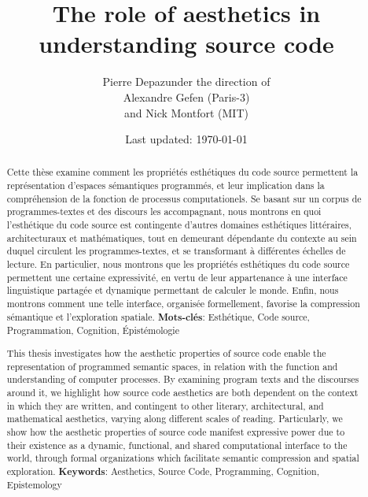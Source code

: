 \documentclass{report}
\begin{document}
\title{The role of aesthetics in understanding source code}
\author{Pierre Depaz\linebreak\linebreak under the direction of\\Alexandre Gefen (Paris-3)\\and Nick Montfort (MIT)}
\date{Last updated: \today}
\maketitle

\renewcommand{\abstractname}{Résumé}
\begin{abstract}
    Cette thèse examine comment les propriétés esthétiques du code source permettent la représentation d'espaces sémantiques programmés, et leur implication dans la compréhension de la fonction de processus computationels. Se basant sur un corpus de programmes-textes et des discours les accompagnant, nous montrons en quoi l'esthétique du code source est contingente d'autres domaines esthétiques littéraires, architecturaux et mathématiques, tout en demeurant dépendante du contexte au sein duquel circulent les programmes-textes, et se transformant à différentes échelles de lecture. En particulier, nous montrons que les propriétés esthétiques du code source permettent une certaine expressivité, en vertu de leur appartenance à une interface linguistique partagée et dynamique permettant de calculer le monde. Enfin, nous montrons comment une telle interface, organisée formellement, favorise la compression sémantique et l'exploration spatiale.
    \linebreak
    \linebreak
    \textbf{Mots-clés}: Esthétique, Code source, Programmation, Cognition, Épistémologie
\end{abstract}

\renewcommand{\abstractname}{Summary}
\begin{abstract}
    This thesis investigates how the aesthetic properties of source code enable the representation of programmed semantic spaces, in relation with the function and understanding of computer processes. By examining program texts and the discourses around it, we highlight how source code aesthetics are both dependent on the context in which they are written, and contingent to other literary, architectural, and mathematical aesthetics, varying along different scales of reading. Particularly, we show how the aesthetic properties of source code manifest expressive power due to their existence as a dynamic, functional, and shared computational interface to the world, through formal organizations which facilitate semantic compression and spatial exploration.
    \linebreak
    \linebreak
    \textbf{Keywords}: Aesthetics, Source Code, Programming, Cognition, Epistemology
\end{abstract}
\end{document}
